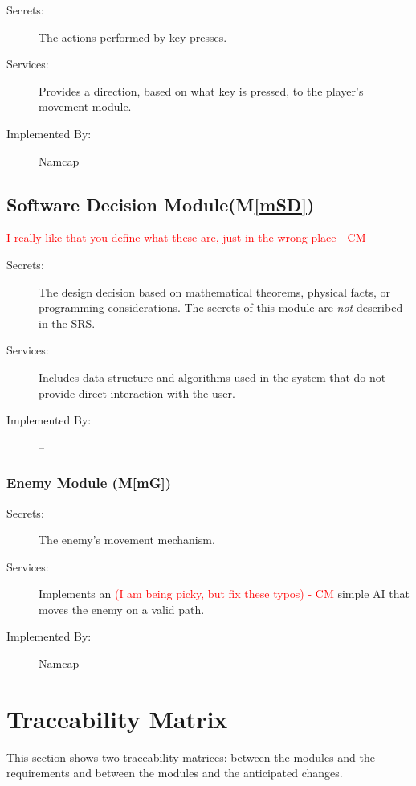 \documentclass[12pt, titlepage]{article}
\newcommand{\mref}[1]{M\ref{#1}}
\begin{document}
\begin{description}
\item[Secrets:]The actions performed by key presses.
\item[Services:]Provides a direction, based on what key is pressed, to the player's movement module.
\item[Implemented By:] Namcap
\end{description}


\subsection{Software Decision Module(\mref{mSD})}
\textcolor{red}{I really like that you define what these are, just in the wrong place - CM} \\
\begin{description}
\item[Secrets:] The design decision based on mathematical theorems, physical
  facts, or programming considerations. The secrets of this module are
  \emph{not} described in the SRS.
\item[Services:] Includes data structure and algorithms used in the system that
  do not provide direct interaction with the user. 
\item[Implemented By:] --
\end{description}

\subsubsection{Enemy Module (\mref{mG})}

\begin{description}
\item[Secrets:]The enemy's movement mechanism.
\item[Services:]Implements an \textcolor{red}{(I am being picky, but fix these typos) - CM} simple AI that moves the enemy on a valid path.
\item[Implemented By:] Namcap
\end{description}


\section{Traceability Matrix} \label{SecTM}

This section shows two traceability matrices: between the modules and the
requirements and between the modules and the anticipated changes.
\end{document}
